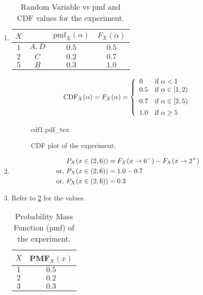 \begin{enumerate}[6a.]
	\item 
		\begin{table}[H]
			\centering
			\caption{Random Variable vs pmf and CDF values for the experiment.}
			\label{tab:pmf6a1}
			\begin{tabular}{cccc}
				\toprule
				$X$ & \text{outcomes} & $\text{pmf}_X(\alpha)$ & $F_X(\alpha)$\\
				\midrule
				$1$ & $A, D$  & $0.5$ & $0.5$ \\
				$2$ & $C$     & $0.2$ & $0.7$ \\
				$5$ & $B$     & $0.3$ & $1.0$ \\
				\bottomrule
			\end{tabular}
		\end{table}
	
		\begin{equation}
			\text{CDF}_X(\alpha) = F_X(\alpha) = \fourpartdef{0}{\alpha<1}{0.5}{\alpha \in [1,2)}{0.7}{\alpha \in [2,5)}{1.0}{\alpha \geq 5} \nonumber
		\end{equation}
		
		\begin{figure}[H]
			\centering
			\begin{adjustbox}{max width=\textwidth}
				{cdf1.pdf_tex}
			\end{adjustbox}
			\caption{CDF plot of the experiment.}
			\label{fig:cdf6a1}
		\end{figure}
	
	\item 
		\begin{align}
			P_X(x \in (2,6)) &= F_X(x \rightarrow 6^-) - F_X(x \rightarrow 2^+) \nonumber\\
			\text{or, } P_X(x \in (2,6)) &= 1.0 - 0.7 \nonumber\\
			\text{or, } P_X(x \in (2,6)) &= 0.3 \nonumber
		\end{align}
	
	\item Refer to \cref{tab:pmf6c1} for the values.
		\begin{table}[H]
			\centering
			\caption{Probability Mass Function (pmf) of the experiment.}
			\label{tab:pmf6c1}
			\begin{tabular}{cc}
				\toprule
				$X$ & PMF$_X(x)$ \\
				\midrule
				$1$ & $0.5$ \\
				$2$ & $0.2$ \\
				$3$ & $0.3$ \\
				\bottomrule
			\end{tabular}
		\end{table}
	

\end{enumerate}
